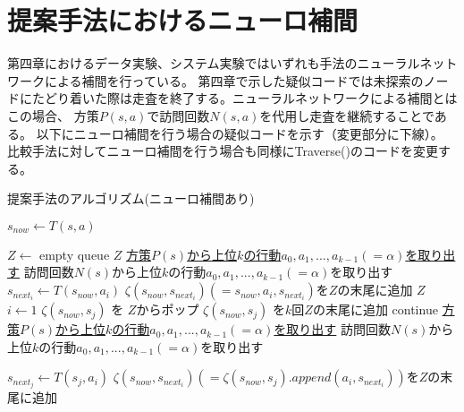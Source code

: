 \section{提案手法におけるニューロ補間}
第四章におけるデータ実験、システム実験ではいずれも手法のニューラルネットワークによる補間を行っている。
第四章で示した疑似コードでは未探索のノードにたどり着いた際は走査を終了する。ニューラルネットワークによる補間とはこの場合、
方策$P(s, a)$で訪問回数$N(s, a)$を代用し走査を継続することである。
以下にニューロ補間を行う場合の疑似コードを示す（変更部分に下線）。
比較手法に対してニューロ補間を行う場合も同様にTraverse()のコードを変更する。
\begin{algorithm}
    \caption{提案手法のアルゴリズム(ニューロ補間あり)}
    \begin{algorithmic}[1]       
           \State $s_{now} \gets T(s, a)$
           
           \State $Z \gets $ empty queue
             \Return  $Z$
            \EndIf
             \State \underline{方策$P(s)$から上位$k$の行動${a_0, a_1, ..., a_{k-1}}(=\alpha)$を取り出す}
            \Else
             \State 訪問回数$N(s)$から上位$k$の行動${a_0, a_1, ..., a_{k-1}}(=\alpha)$を取り出す
            \EndIf
             \State $s_{{next}_i} \gets T(s_{now}, a_i)$
             \State $\zeta(s_{now},s_{{next}_i})(={s_{now}, a_i, s_{{next}_i}})$を$Z$の末尾に追加
           \EndFor
             \Return $Z$
           \EndIf
           \State $i \gets 1$
                    \State $\zeta(s_{now}, s_{j})$ を $Z$からポップ
                        \State $\zeta(s_{now}, s_{j})$ を$k$回$Z$の末尾に追加
                        \State continue
                    \EndIf
                       \State \underline{方策$P(s)$から上位$k$の行動${a_0, a_1, ..., a_{k-1}}(=\alpha)$を取り出す}
                   \Else
                    \State 訪問回数$N(s)$から上位$k$の行動${a_0, a_1, ..., a_{k-1}}(=\alpha)$を取り出す
                   \EndIf
                    
                        \State $s_{{next}_j} \gets T(s_{j}, a_i)$
                        \State $\zeta(s_{now},s_{{next}_i})(=\zeta(s_{now}, s_{j}).append({a_i, s_{{next}_i}}))$を$Z$の末尾に追加
                    \EndFor
                    

\end{algorithmic}
\end{algorithm}
